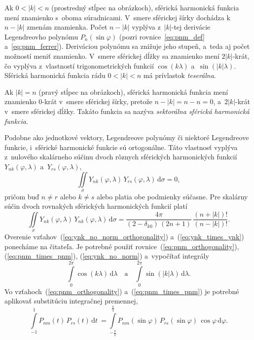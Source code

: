 \documentclass[a4paper,12pt]{book}
\newcommand{\diff}{\mathrm d}
\begin{document}
Ak $0 < |k| < n$ (prostredný stĺpec na obrázkoch), sférická harmonická funkcia
mení znamienko s~oboma súradnicami.  V~smere sférickej šírky dochádza k~$n
- |k|$ zmenám znamienka.  Počet $n - |k|$ vyplýva z~$|k|$-tej derivácie
Legendreovho polynómu $P_n(\sin\varphi)$ (pozri rovnice~\ref{eq:pnm_def}
a~\ref{eq:pnm_ferrer}).  Deriváciou polynómu sa znižuje jeho stupeň, a~teda aj
počet možností meniť znamienko.  V~smere sférickej dĺžky sa znamienko mení
$2|k|$-krát, čo vyplýva z~vlastností trigonometrických funkcií
$\cos(k\lambda)$ a~$\sin(|k|\lambda)$.  Sférická harmonická funkcia rádu $0
< |k| < n$ má prívlastok \emph{teserálna}.

Ak $|k| = n$ (pravý stĺpec na obrázkoch), sférická harmonická funkcia
mení znamienko $0$-krát v~smere sférickej šírky, pretože $n - |k| = n - n = 0$,
a~$2|k|$-krát v~smere sférickej dĺžky.  Takáto funkcia sa nazýva
\emph{sektorálna sférická harmonická funkcia}.

Podobne ako jednotkové vektory, Legendreove polynómy či niektoré Legendreove
funkcie, i~sférické harmonické funkcie sú ortogonálne.  Táto vlastnosť vyplýva
z~nulového skalárneho súčinu dvoch rôznych sférických harmonických funkcií
$Y_{nk}(\varphi, \lambda)$ a~$Y_{rs}(\varphi, \lambda)$,
%
\begin{equation}
\label{eq:ynk_no_norm_orthogonality}
\iint\limits_{\sigma} Y_{nk}(\varphi, \lambda) \, Y_{rs}(\varphi, \lambda) \, 
\diff \sigma = 0{,}
\end{equation}
%
pričom buď $n \neq r$ alebo $k \neq s$ alebo platia obe podmienky súčasne.  Pre
skalárny súčin dvoch rovnakých sférických harmonických funkcií platí
%
\begin{equation}
\label{eq:ynk_times_ynk}
\iint\limits_{\sigma} Y_{nk}(\varphi, \lambda) \, Y_{nk}(\varphi, \lambda) \, 
\diff \sigma =
%
\dfrac{4\pi}{(2 - \delta_{k0}) \, (2n + 1)} \, \dfrac{(n + |k|)!}{(n
- |k|)!}{.}
\end{equation}
%
Overenie vzťahov~(\ref{eq:ynk_no_norm_orthogonality})
a~(\ref{eq:ynk_times_ynk}) ponecháme na čitateľa.  Je potrebné použiť
rovnice~(\ref{eq:pnm_orthogonality}), (\ref{eq:pnm_times_pnm}),
(\ref{eq:ynk_no_norm}) a~vypočítať integrály
%
\begin{equation}
\int\limits_{0}^{2\pi} \cos(k \lambda) \, \diff\lambda \quad \text{a} \quad
\int\limits_{0}^{2\pi} \sin(|k| \lambda) \, \diff\lambda{.}
\end{equation}
%
Vo vzťahoch~(\ref{eq:pnm_orthogonality}) a~(\ref{eq:pnm_times_pnm}) je potrebné
aplikovať substitúciu integračnej premennej,
%
\begin{equation}
\int\limits_{-1}^{1} P_{nm}(t) \, P_{rs}(t) \, \diff
t~= \int\limits_{-\frac{\pi}{2}}^{\frac{\pi}{2}} P_{nm}(\sin\varphi) \,
P_{rs}(\sin\varphi) \, \cos\varphi \, \diff \varphi{.}
\end{equation}
\end{document}

